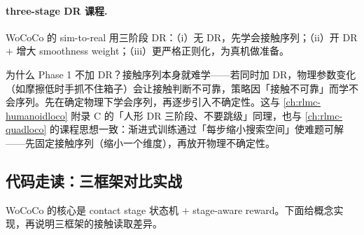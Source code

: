 
\paragraph{three-stage DR 课程.}
WoCoCo 的 sim-to-real 用三阶段 DR：（i）无 DR，先学会接触序列；（ii）开 DR $+$ 增大 smoothness weight；（iii）更严格正则化，为真机做准备。

\begin{insight}\label{ins:rlmc-wbc-dr3}
为什么 Phase 1 不加 DR？接触序列本身就难学——若同时加 DR，物理参数变化（如摩擦低时手抓不住箱子）会让接触判断不可靠，策略因「接触不可靠」而学不会序列。先在确定物理下学会序列，再逐步引入不确定性。这与 \cref{ch:rlmc-humanoidloco} 附录 C 的「人形 DR 三阶段、不要跳级」同理，也与 \cref{ch:rlmc-quadloco} 的课程思想一致：渐进式训练通过「每步缩小搜索空间」使难题可解——先固定接触序列（缩小一个维度），再放开物理不确定性。
\end{insight}

\subsection{代码走读：三框架对比实战}
WoCoCo 的核心是 contact stage 状态机 $+$ stage-aware reward。下面给概念实现，再说明三框架的接触读取差异。

